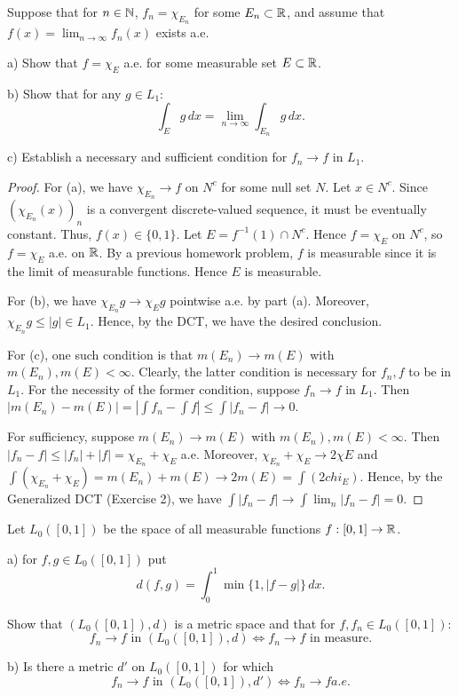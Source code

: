 \documentclass{article}
\begin{document}
 Suppose that for $n \in \mathbb{N}$, $f_n = \chi_{E_n}$ for some $E_n \subset \mathbb{R}$, and assume that $f(x) = \lim_{n \to \infty} f_n(x)$ exists a.e.

a) Show that $f = \chi_E$ a.e. for some measurable set $E \subset \mathbb{R}$.

b) Show that for any $g \in L_1$:
$$ \int_E g \, dx = \lim_{n \to \infty} \int_{E_n} g \, dx.$$

c) Establish a necessary and sufficient condition for $f_n \to f$ in $L_1$.

\begin{proof}
For (a), we have $\chi_{E_n} \to f$ on $N^c$ for some null set $N$.  Let $x \in N^c$. Since $(\chi_{E_n}(x))_n$ is a convergent discrete-valued sequence, it must be eventually constant.  Thus, $f(x) \in \{0,1\}$.  Let $E = f^{-1}(1) \cap N^c$.  Hence $f = \chi_E$ on $N^c$, so $f = \chi_E$ a.e. on $\mathbb{R}$. By a previous homework problem, $f$ is measurable since it is the limit of measurable functions.  Hence $E$ is measurable.  

For (b), we have $\chi_{E_n} g \to \chi_E g$ pointwise a.e. by part (a).  Moreover, $\chi_{E_n} g \le |g| \in L_1$. Hence, by the DCT, we have the desired conclusion.

For (c), one such condition is that $m(E_n) \to m(E)$ with $m(E_n), m(E) < \infty$.  Clearly, the latter condition is necessary for $f_n, f$ to be in $L_1$.  For the necessity of the former condition, suppose $f_n \to f$ in $L_1$.  Then $|m(E_n) - m(E)| = |\int f_n - \int f | \le \int |f_n - f| \to 0$.

For sufficiency, suppose $m(E_n) \to m(E)$ with $m(E_n), m(E) < \infty$.    Then $|f_n - f| \le |f_n| + |f| = \chi_{E_n} + \chi_E$ a.e.  Moreover, $\chi_{E_n} + \chi_E \to 2 \chi E$ and $\int (\chi_{E_n} + \chi_E) = m(E_n) + m(E) \to 2 m(E) = \int (2 chi_E)$.  Hence, by the Generalized DCT (Exercise 2), we have
$\int |f_n - f| \to \int \lim_n |f_n - f| = 0$.
\end{proof}

 Let $L_0([0,1])$ be the space of all measurable functions $f : [0,1] \to \mathbb{R}$.

a) for $f,g \in L_0([0,1])$ put
$$d(f, g) = \int_0^1 \min\{1, |f - g|\} \, dx.$$

Show that $(L_0([0,1]), d)$ is a metric space and that for $f, f_n \in L_0([0,1])$:
$$ f_n \to f \text{ in } (L_0([0,1]), d) \iff f_n \to f \text { in measure.}$$

b) Is there a metric $d'$ on $L_0([0,1])$ for which 
$$f_n \to f \text{ in } (L_0([0,1]), d') \iff f_n \to f a.e.  $$
\end{document}
